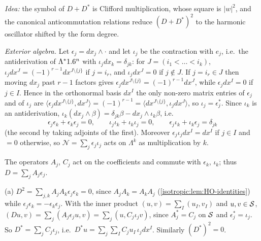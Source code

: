 \emph{Idea:} the symbol of $D+D^*$ is Clifford multiplication, whose square is
$|w|^2$, and the canonical anticommutation relations reduce $(D+D^*)^2$ to the
harmonic oscillator shifted by the form degree.

\emph{Exterior algebra.} Let $\epsilon_j=dx_j\wedge\cdot$ and let $\iota_j$ be the
contraction with $e_j$, i.e.\ the antiderivation of $\Lambda^*1.6^n$ with
$\iota_jdx_k=\delta_{jk}$: for $J=(i_1<\dots<i_k)$,
$\iota_jdx^J=(-1)^{r-1}dx^{J\setminus\{j\}}$ if $j=i_r$, and $\iota_jdx^J=0$ if
$j\notin J$. If $j=i_r\in J$ then moving $dx_j$ past $r-1$ factors gives
$\epsilon_jdx^{J\setminus\{j\}}=(-1)^{r-1}dx^J$, while $\epsilon_jdx^I=0$ if $j\in I$.
Hence in the orthonormal basis $dx^I$ the only non-zero matrix entries of
$\epsilon_j$ and of $\iota_j$ are
$\langle\epsilon_jdx^{J\setminus\{j\}},dx^J\rangle=(-1)^{r-1}=\langle dx^{J\setminus\{j\}},\iota_jdx^J\rangle$,
so $\iota_j=\epsilon_j^*$. Since $\iota_k$ is an antiderivation,
$\iota_k(dx_j\wedge\beta)=\delta_{jk}\beta-dx_j\wedge\iota_k\beta$, i.e.
\begin{equation*}
  \epsilon_j\epsilon_k+\epsilon_k\epsilon_j=0,\qquad\iota_j\iota_k+\iota_k\iota_j=0,\qquad
  \epsilon_j\iota_k+\iota_k\epsilon_j=\delta_{jk}
\end{equation*}
(the second by taking adjoints of the first). Moreover $\epsilon_j\iota_jdx^I=dx^I$
if $j\in I$ and $=0$ otherwise, so $\mathcal N=\sum_j\epsilon_j\iota_j$ acts on
$\Lambda^k$ as multiplication by $k$.

The operators $A_j$, $C_j$ act on the coefficients and commute with $\epsilon_k$,
$\iota_k$; thus $D=\sum_jA_j\epsilon_j$.

(a) $D^2=\sum_{j,k}A_jA_k\epsilon_j\epsilon_k=0$, since $A_jA_k=A_kA_j$
(\cref{isotropic:lem:HO-identities}) while $\epsilon_j\epsilon_k=-\epsilon_k\epsilon_j$.
With the inner product $(u,v)=\sum_I(u_I,v_I)$ and $u,v\in\mathcal{S}$,
$(Du,v)=\sum_j(A_j\epsilon_ju,v)=\sum_j(u,C_j\iota_jv)$, since $A_j^*=C_j$ on $\mathcal{S}$
and $\epsilon_j^*=\iota_j$. So $D^*=\sum_jC_j\iota_j$, i.e.\
$D^*u=\sum_j\sum_IC_ju_I\,\iota_jdx^I$. Similarly $(D^*)^2=0$.

